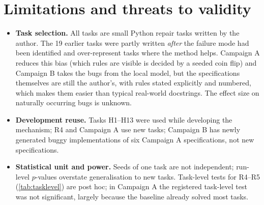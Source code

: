 \documentclass[11pt]{article}
\begin{document}
\section{Limitations and threats to validity}\label{sec:limitations}
\begin{itemize}
\item \textbf{Task selection.} All tasks are small Python repair tasks written by the author. The 19 earlier tasks were partly written \emph{after} the failure mode had been identified and over-represent tasks where the method helps. Campaign A reduces this bias (which rules are visible is decided by a seeded coin flip) and Campaign B takes the bugs from the local model, but the specifications themselves are still the author's, with rules stated explicitly and numbered, which makes them easier than typical real-world docstrings. The effect size on naturally occurring bugs is unknown.
\item \textbf{Development reuse.} Tasks H1--H13 were used while developing the mechanism; R4 and Campaign A use new tasks; Campaign B has newly generated buggy implementations of six Campaign A specifications, not new specifications.
\item \textbf{Statistical unit and power.} Seeds of one task are not independent; run-level $p$-values overstate generalisation to new tasks. Task-level tests for R4--R5 (\cref{tab:tasklevel}) are post hoc; in Campaign A the registered task-level test was not significant, largely because the baseline already solved most tasks.


\end{itemize}
\end{document}
